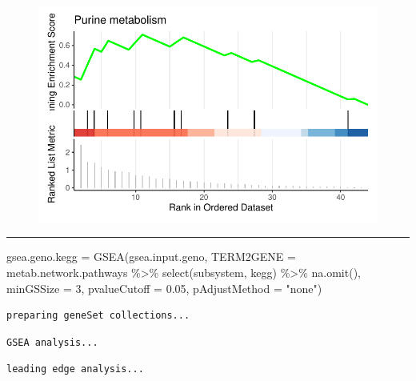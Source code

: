 \documentclass[
  24px,
  letterpaper,
  DIV=11,
  numbers=noendperiod]{scrartcl}
\newenvironment{Shaded}{\begin{snugshade}}{\end{snugshade}}
\newcommand{\AttributeTok}[1]{\textcolor[rgb]{0.40,0.45,0.13}{#1}}
\newcommand{\DecValTok}[1]{\textcolor[rgb]{0.68,0.00,0.00}{#1}}
\newcommand{\FloatTok}[1]{\textcolor[rgb]{0.68,0.00,0.00}{#1}}
\newcommand{\FunctionTok}[1]{\textcolor[rgb]{0.28,0.35,0.67}{#1}}
\newcommand{\NormalTok}[1]{\textcolor[rgb]{0.00,0.23,0.31}{#1}}
\newcommand{\OtherTok}[1]{\textcolor[rgb]{0.00,0.23,0.31}{#1}}
\newcommand{\SpecialCharTok}[1]{\textcolor[rgb]{0.37,0.37,0.37}{#1}}
\newcommand{\StringTok}[1]{\textcolor[rgb]{0.13,0.47,0.30}{#1}}
\begin{document}
\begin{figure}[H]

{\centering \includegraphics{index_files/figure-pdf/unnamed-chunk-44-1.pdf}

}

\end{figure}

\begin{center}\rule{0.5\linewidth}{0.5pt}\end{center}

\begin{Shaded}
\begin{Highlighting}[]
\NormalTok{gsea.geno.kegg }\OtherTok{=} \FunctionTok{GSEA}\NormalTok{(gsea.input.geno, }
                      \AttributeTok{TERM2GENE =}\NormalTok{ metab.network.pathways }\SpecialCharTok{\%\textgreater{}\%} \FunctionTok{select}\NormalTok{(subsystem, kegg) }\SpecialCharTok{\%\textgreater{}\%} \FunctionTok{na.omit}\NormalTok{(),}
                      \AttributeTok{minGSSize =} \DecValTok{3}\NormalTok{, }\AttributeTok{pvalueCutoff =} \FloatTok{0.05}\NormalTok{, }\AttributeTok{pAdjustMethod =} \StringTok{"none"}\NormalTok{)}
\end{Highlighting}
\end{Shaded}

\begin{verbatim}
preparing geneSet collections...
\end{verbatim}

\begin{verbatim}
GSEA analysis...
\end{verbatim}

\begin{verbatim}
leading edge analysis...
\end{verbatim}
\end{document}
